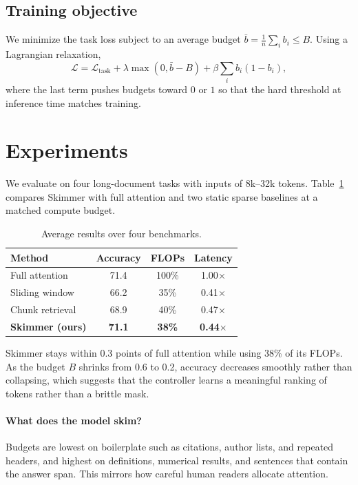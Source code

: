 \documentclass[10pt,twocolumn]{article}
\begin{document}
\subsection{Training objective}
We minimize the task loss subject to an average budget $\bar b = \frac{1}{n}\sum_i b_i \le B$. Using a Lagrangian relaxation,
\begin{equation}
\mathcal{L} = \mathcal{L}_{\text{task}} + \lambda \max(0, \bar b - B) + \beta \sum_i b_i (1-b_i),
\end{equation}
where the last term pushes budgets toward $0$ or $1$ so that the hard threshold at inference time matches training.

\section{Experiments}
We evaluate on four long-document tasks with inputs of 8k--32k tokens. Table~\ref{tab:main} compares Skimmer with full attention and two static sparse baselines at a matched compute budget.

\begin{table}[t]
\centering\small
\begin{tabular}{lccc}
\toprule
Method & Accuracy & FLOPs & Latency \\
\midrule
Full attention & 71.4 & 100\% & 1.00$\times$ \\
Sliding window & 66.2 & 35\% & 0.41$\times$ \\
Chunk retrieval & 68.9 & 40\% & 0.47$\times$ \\
\textbf{Skimmer (ours)} & \textbf{71.1} & \textbf{38\%} & \textbf{0.44$\times$} \\
\bottomrule
\end{tabular}
\caption{Average results over four benchmarks.}
\label{tab:main}
\end{table}

Skimmer stays within 0.3 points of full attention while using 38\% of its FLOPs. As the budget $B$ shrinks from 0.6 to 0.2, accuracy decreases smoothly rather than collapsing, which suggests that the controller learns a meaningful ranking of tokens rather than a brittle mask.

\paragraph{What does the model skim?} Budgets are lowest on boilerplate such as citations, author lists, and repeated headers, and highest on definitions, numerical results, and sentences that contain the answer span. This mirrors how careful human readers allocate attention.
\end{document}
